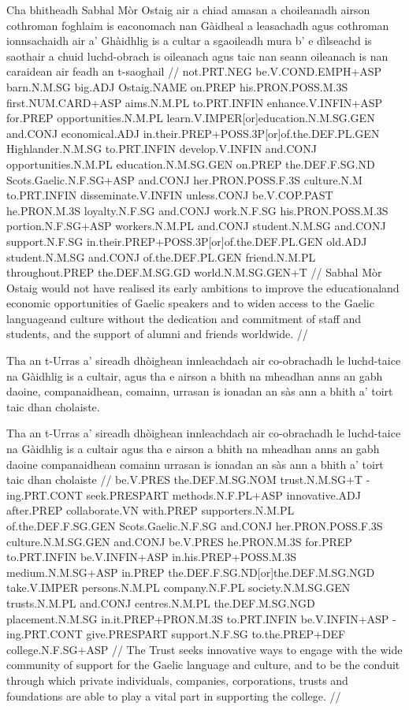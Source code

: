 \documentclass[a4paper,10pt]{article}
\begin{document}
\vspace{4mm}
\gla Cha bhitheadh Sabhal Mòr Ostaig air a chiad amasan a choileanadh airson cothroman foghlaim is eaconomach nan Gàidheal a leasachadh agus cothroman ionnsachaidh air a' Ghàidhlig is a cultar a sgaoileadh mura b' e dìlseachd is saothair a chuid luchd-obrach is oileanach agus taic nan seann oileanach is nan caraidean {air feadh} an t-saoghail  //
\glb not.PRT.NEG be.V.COND.EMPH+ASP barn.N.M.SG big.ADJ Ostaig.NAME on.PREP his.PRON.POSS.M.3S first.NUM.CARD+ASP aims.N.M.PL to.PRT.INFIN enhance.V.INFIN+ASP for.PREP opportunities.N.M.PL learn.V.IMPER[or]education.N.M.SG.GEN and.CONJ economical.ADJ in.their.PREP+POSS.3P[or]of.the.DEF.PL.GEN Highlander.N.M.SG to.PRT.INFIN develop.V.INFIN and.CONJ opportunities.N.M.PL education.N.M.SG.GEN on.PREP the.DEF.F.SG.ND Scots.Gaelic.N.F.SG+ASP and.CONJ her.PRON.POSS.F.3S culture.N.M to.PRT.INFIN disseminate.V.INFIN unless.CONJ be.V.COP.PAST he.PRON.M.3S loyalty.N.F.SG and.CONJ work.N.F.SG his.PRON.POSS.M.3S portion.N.F.SG+ASP workers.N.M.PL and.CONJ student.N.M.SG and.CONJ support.N.F.SG in.their.PREP+POSS.3P[or]of.the.DEF.PL.GEN old.ADJ student.N.M.SG and.CONJ of.the.DEF.PL.GEN friend.N.M.PL throughout.PREP the.DEF.M.SG.GD world.N.M.SG.GEN+T  //
\glft Sabhal Mòr Ostaig would not have realised its early ambitions to improve the educationaland economic opportunities of Gaelic speakers and to widen access to the Gaelic languageand culture without the dedication and commitment of staff and students, and the support of alumni and friends worldwide. //
\endgl
\xe

\ex
\begingl
\glpre Tha an t-Urras a' sireadh dhòighean innleachdach air co-obrachadh le luchd-taice na Gàidhlig is a cultair, agus tha e airson a bhith na mheadhan anns an gabh daoine, companaidhean, comainn, urrasan is ionadan an sàs ann a bhith a' toirt taic dhan cholaiste. 

\vspace{4mm}
\gla Tha an t-Urras a' sireadh dhòighean innleachdach air co-obrachadh le luchd-taice na Gàidhlig is a cultair agus tha e airson a bhith na mheadhan anns an gabh daoine companaidhean comainn urrasan is ionadan an sàs ann a bhith a' toirt taic dhan cholaiste  //
\glb be.V.PRES the.DEF.M.SG.NOM trust.N.M.SG+T -ing.PRT.CONT seek.PRESPART methods.N.F.PL+ASP innovative.ADJ after.PREP collaborate.VN with.PREP supporters.N.M.PL of.the.DEF.F.SG.GEN Scots.Gaelic.N.F.SG and.CONJ her.PRON.POSS.F.3S culture.N.M.SG.GEN and.CONJ be.V.PRES he.PRON.M.3S for.PREP to.PRT.INFIN be.V.INFIN+ASP in.his.PREP+POSS.M.3S medium.N.M.SG+ASP in.PREP the.DEF.F.SG.ND[or]the.DEF.M.SG.NGD take.V.IMPER persons.N.M.PL company.N.F.PL society.N.M.SG.GEN trusts.N.M.PL and.CONJ centres.N.M.PL the.DEF.M.SG.NGD placement.N.M.SG in.it.PREP+PRON.M.3S to.PRT.INFIN be.V.INFIN+ASP -ing.PRT.CONT give.PRESPART support.N.F.SG to.the.PREP+DEF college.N.F.SG+ASP  //
\glft The Trust seeks innovative ways to engage with the wide community of support for the Gaelic language and culture, and to be the conduit through which private individuals, companies, corporations, trusts and foundations are able to play a vital part in supporting the college. //
\endgl
\xe
\end{document}
